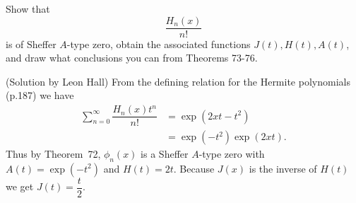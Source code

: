 \begin{problem}\label{problem3chapter13}
Show that
$$\dfrac{H_n(x)}{n!}$$
is of Sheffer $A$-type zero, obtain the associated functions $J(t), H(t), A(t)$, and draw what conclusions you can from Theorems 73-76.
\end{problem}
\begin{solution}(Solution by Leon Hall)
From the defining relation for the Hermite polynomials (p.187) we have
$$\begin{array}{ll}
\displaystyle\sum_{n=0}^{\infty} \dfrac{H_n(x)t^n}{n!} &= \exp(2xt-t^2) \\
&= \exp(-t^2)\exp(2xt).
\end{array}$$
Thus by Theorem~72, $\phi_n(x)$ is a Sheffer $A$-type zero with $A(t)=\exp(-t^2)$ and $H(t)=2t$. Because $J(x)$ is the inverse of $H(t)$ we get $J(t)=\dfrac{t}{2}$. 


\end{solution}
